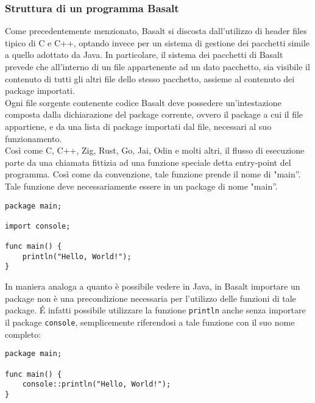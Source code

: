 \subsubsection{Struttura di un programma Basalt}
Come precedentemente menzionato, Basalt si discosta dall'utilizzo di header files tipico di C e C++, optando invece per un sistema di gestione dei pacchetti simile a quello adottato da Java. In particolare, 
il sistema dei pacchetti di Basalt prevede che all’interno di un file appartenente ad un dato pacchetto, sia visibile il contenuto di tutti gli altri file dello stesso pacchetto, assieme al contenuto 
dei package importati. \\

Ogni file sorgente contenente codice Basalt deve possedere un'intestazione composta dalla dichiarazione del package corrente, ovvero il package a cui il file appartiene, e 
da una lista di package importati dal file, necessari al suo funzionamento. \\
 
Così come C, C++, Zig, Rust, Go, Jai, Odin e molti altri, il flusso di esecuzione parte da una chiamata fittizia ad una funzione speciale detta entry-point del programma. Così 
come da convenzione, tale funzione prende il nome di "main”. Tale funzione deve necessariamente essere in un package di nome "main”. \\


\begin{lstlisting}[frame=single]
package main;

import console;

func main() {
    println("Hello, World!");
}
\end{lstlisting}

\vspace{0.5cm}

In maniera analoga a quanto è possibile vedere in Java, in Basalt importare un package non 
è una precondizione necessaria per l'utilizzo delle funzioni di tale package. É infatti possibile
utilizzare la funzione \texttt{println} anche senza importare il package \texttt{console}, semplicemente riferendosi
a tale funzione con il suo nome completo: \\

\begin{lstlisting}[frame=single]
package main;

func main() {
    console::println("Hello, World!");
}
\end{lstlisting}
    